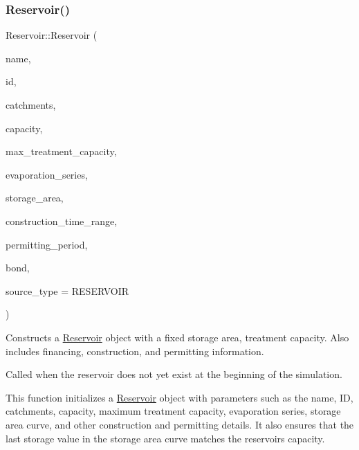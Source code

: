 \subsubsection{\texorpdfstring{Reservoir()}{Reservoir()}\hspace{0.1cm}{\footnotesize\ttfamily [4/9]}}
{\footnotesize\ttfamily Reservoir\+::\+Reservoir (\begin{DoxyParamCaption}\item[{const char $\ast$}]{name,  }\item[{const int}]{id,  }\item[{const vector$<$ \mbox{\hyperlink{classCatchment}{Catchment}} $\ast$$>$ \&}]{catchments,  }\item[{const double}]{capacity,  }\item[{const double}]{max\+\_\+treatment\+\_\+capacity,  }\item[{\mbox{\hyperlink{classEvaporationSeries}{Evaporation\+Series}} \&}]{evaporation\+\_\+series,  }\item[{double}]{storage\+\_\+area,  }\item[{const vector$<$ double $>$ \&}]{construction\+\_\+time\+\_\+range,  }\item[{double}]{permitting\+\_\+period,  }\item[{\mbox{\hyperlink{classBond}{Bond}} \&}]{bond,  }\item[{int}]{source\+\_\+type = {\ttfamily RESERVOIR} }\end{DoxyParamCaption})}



Constructs a \mbox{\hyperlink{classReservoir}{Reservoir}} object with a fixed storage area, treatment capacity. Also includes financing, construction, and permitting information. 

Called when the reservoir does not yet exist at the beginning of the simulation.

This function initializes a \mbox{\hyperlink{classReservoir}{Reservoir}} object with parameters such as the name, ID, catchments, capacity, maximum treatment capacity, evaporation series, storage area curve, and other construction and permitting details. It also ensures that the last storage value in the storage area curve matches the reservoir\textquotesingle{}s capacity.


